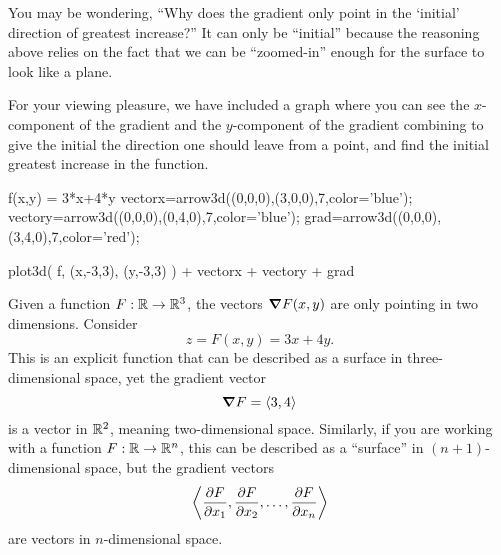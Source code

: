 \documentclass{ximera}
\begin{document}
You may be wondering, ``Why does the gradient only point in the
`initial' direction of greatest increase?''  It can only be
``initial'' because the reasoning above relies on the fact that we can
be ``zoomed-in'' enough for the surface to look like a plane.
\begin{onlineOnly}
For your viewing pleasure, we have included a graph where you can see
the $x$-component of the gradient and the $y$-component of the
gradient combining to give the initial the direction one should leave
from a point, and find the initial greatest increase in the function.
\begin{sageCell}
f(x,y) = 3*x+4*y
vectorx=arrow3d((0,0,0),(3,0,0),7,color='blue');
vectory=arrow3d((0,0,0),(0,4,0),7,color='blue');
grad=arrow3d((0,0,0),(3,4,0),7,color='red');

plot3d( f, (x,-3,3), (y,-3,3) ) + vectorx + vectory + grad
\end{sageCell}
\end{onlineOnly}
\begin{remark}
  Given a function $F:\R\to\R^3$, the vectors $\grad F(x,y)$ are only
  pointing in two dimensions. Consider
  \[
  z = F(x,y) = 3x+4y.
  \]
  This is an explicit function that can be described as a surface in
  three-dimensional space, yet the gradient vector
  \[
  \grad F = \vector{3, 4}
  \]
  is a vector in $\R^2$, meaning two-dimensional space. Similarly, if
  you are working with a function $F:\R\to\R^n$, this can be described
  as a ``surface'' in $(n+1)$-dimensional space, but the gradient
  vectors
  \[
  \vector{\pp[F]{x_1},\pp[F]{x_2},\dots,\pp[F]{x_n}}
  \]
  are vectors in $n$-dimensional space.
\end{remark}
\end{document}
